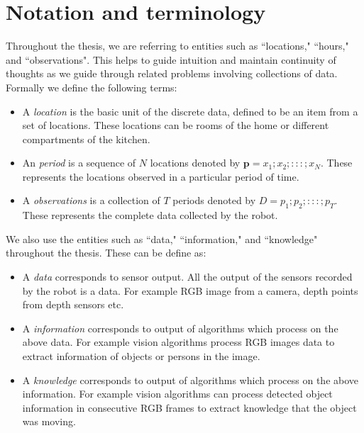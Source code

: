 \section{Notation and terminology}
Throughout the thesis, we are referring to entities such as ``locations," ``hours," and ``observations".
This helps to guide intuition and maintain continuity of thoughts as we guide through related problems involving collections of data.
Formally we define the following terms:
\begin{itemize}
	\item A \emph{location} is the basic unit of the discrete data, defined to be an item from a set of locations. These locations can be rooms of the home or different compartments of the kitchen. 
	\item An \emph{period} is a sequence of $N$ locations denoted by $\textbf{p} = {x_1;x_2;:::;x_N}$. These represents the locations observed in a particular period of time.
	\item A \emph{observations} is a collection of $T$ periods denoted by $ D = {p_1;p_2;:::;p_T}$. These represents the complete data collected by the robot.
\end{itemize}


We also use the entities such as ``data," ``information," and ``knowledge" throughout the thesis. These can be define as:
\begin{itemize}
	\item A \emph{data} corresponds to sensor output. All the output of the sensors recorded by the robot is a data. For example RGB image from a camera, depth points from depth sensors etc.
	\item A \emph{information} corresponds to output of algorithms which process on the above data. For example vision algorithms process RGB images data to extract information of objects or persons in the image.
	\item A \emph{knowledge} corresponds to output of algorithms which process on the above information. For example vision algorithms can process detected object information in consecutive RGB frames to extract knowledge that the object was moving.
\end{itemize}

